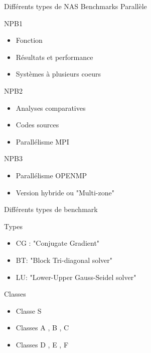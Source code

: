 \documentclass{beamer}
\begin{document}
\begin{frame}{Différents types de NAS Benchmarks Parallèle}

  \begin{block}{NPB1}
    \begin{itemize}
    \item Fonction
    \item Résultats et performance
    \item Systèmes à plusieurs coeurs
    \end{itemize}
  \end{block}
  
  \begin{block}{NPB2}
    \begin{itemize}
    \item Analyses comparatives
    \item Codes sources
    \item Parallélisme  MPI
    \end{itemize}
  \end{block}
  
  \begin{block}{NPB3}
    \begin{itemize}
    \item Parallélisme OPENMP
    \item Version hybride ou "Multi-zone" 
    \end{itemize}
  \end{block}

\end{frame}

\begin{frame}{ Différents types de benchmark}

  \begin{block}{Types}
    \begin{itemize}
    \item CG : "Conjugate Gradient" 
    \item BT: "Block Tri-diagonal solver"
    \item LU: "Lower-Upper Gauss-Seidel solver"
    \end{itemize}
  \end{block}
  
  \begin{block}{Classes}
    \begin{itemize}
    \item Classe S 
    \item  Classes A , B , C 
    \item Classes D , E , F
    \end{itemize}
  \end{block}
  
\end{frame}
\end{document}
